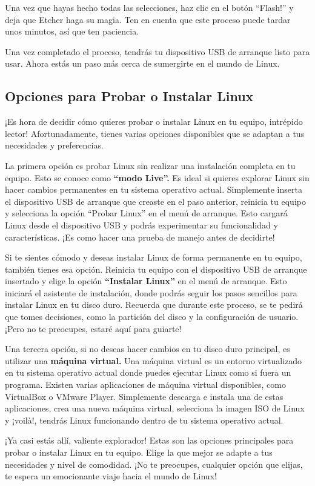 \documentclass[
  a4paper,
]{article}
\begin{document}
Una vez que hayas hecho todas las selecciones, haz clic en el botón
``Flash!'' y deja que Etcher haga su magia. Ten en cuenta que este
proceso puede tardar unos minutos, así que ten paciencia.

Una vez completado el proceso, tendrás tu dispositivo USB de arranque
listo para usar. Ahora estás un paso más cerca de sumergirte en el mundo
de Linux.

\hypertarget{opciones-para-probar-o-instalar-linux}{%
\subsection{Opciones para Probar o Instalar
Linux}\label{opciones-para-probar-o-instalar-linux}}

¡Es hora de decidir cómo quieres probar o instalar Linux en tu equipo,
intrépido lector! Afortunadamente, tienes varias opciones disponibles
que se adaptan a tus necesidades y preferencias.

La primera opción es probar Linux sin realizar una instalación completa
en tu equipo. Esto se conoce como \textbf{``modo Live''.} Es ideal si
quieres explorar Linux sin hacer cambios permanentes en tu sistema
operativo actual. Simplemente inserta el dispositivo USB de arranque que
creaste en el paso anterior, reinicia tu equipo y selecciona la opción
``Probar Linux'' en el menú de arranque. Esto cargará Linux desde el
dispositivo USB y podrás experimentar su funcionalidad y
características. ¡Es como hacer una prueba de manejo antes de decidirte!

Si te sientes cómodo y deseas instalar Linux de forma permanente en tu
equipo, también tienes esa opción. Reinicia tu equipo con el dispositivo
USB de arranque insertado y elige la opción \textbf{``Instalar Linux''}
en el menú de arranque. Esto iniciará el asistente de instalación, donde
podrás seguir los pasos sencillos para instalar Linux en tu disco duro.
Recuerda que durante este proceso, se te pedirá que tomes decisiones,
como la partición del disco y la configuración de usuario. ¡Pero no te
preocupes, estaré aquí para guiarte!

Una tercera opción, si no deseas hacer cambios en tu disco duro
principal, es utilizar una \textbf{máquina virtual.} Una máquina virtual
es un entorno virtualizado en tu sistema operativo actual donde puedes
ejecutar Linux como si fuera un programa. Existen varias aplicaciones de
máquina virtual disponibles, como VirtualBox o VMware Player.
Simplemente descarga e instala una de estas aplicaciones, crea una nueva
máquina virtual, selecciona la imagen ISO de Linux y ¡voilà!, tendrás
Linux funcionando dentro de tu sistema operativo actual.

¡Ya casi estás allí, valiente explorador! Estas son las opciones
principales para probar o instalar Linux en tu equipo. Elige la que
mejor se adapte a tus necesidades y nivel de comodidad. ¡No te
preocupes, cualquier opción que elijas, te espera un emocionante viaje
hacia el mundo de Linux!


\printbibliography
\end{document}
